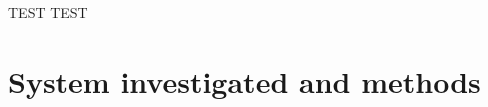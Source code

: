 \documentclass[authoryear,preprint,12pt]{elsarticle}
\begin{document}
TEST TEST




\section{System investigated and methods}


\clearpage
\appendix







\end{document}
